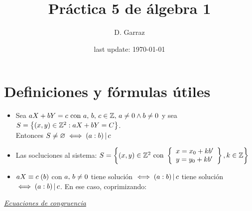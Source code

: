 \documentclass[12pt,a4paper, spanish]{article}
\begin{document}
\pagestyle{empty} %

\title{Práctica 5 de álgebra 1} %
\author{D. Garraz} %
\date{last update: \today} %

\maketitle  %

\section{Definiciones y fórmulas útiles}

\def\mcd{(a:b)}

\begin{itemize}
	\item Sea $aX + bY = c \text{ con } a,\, b,\, c \en \enteros,\, a \distinto 0 \y b \distinto 0$ y sea
	      $S = \set{ (x,y) \en \enteros^2 : aX + bY = C }$.\\
	      Entonces $S \distinto \vacio \sisolosi (a:b) \divide c$

	\item Las socluciones al sistema: $S = \set{(x,y) \en \enteros^2 \text{ con }
			      \llaves{l}{
				      x = x_0 + kb'\\
				      y = y_0 + kb'
			      }
			      , k \en \enteros}
	      $

	\item $\congruencia{aX}{c}{b}$ con $ a,\, b \distinto 0$ tiene solución $\sisolosi \mcd \divide c$ tiene solución $\sisolosi \mcd \divide c$. En ese caso, coprimizando:
\end{itemize}

\textit\underline{Ecuaciones de congruencia}
\end{document}
